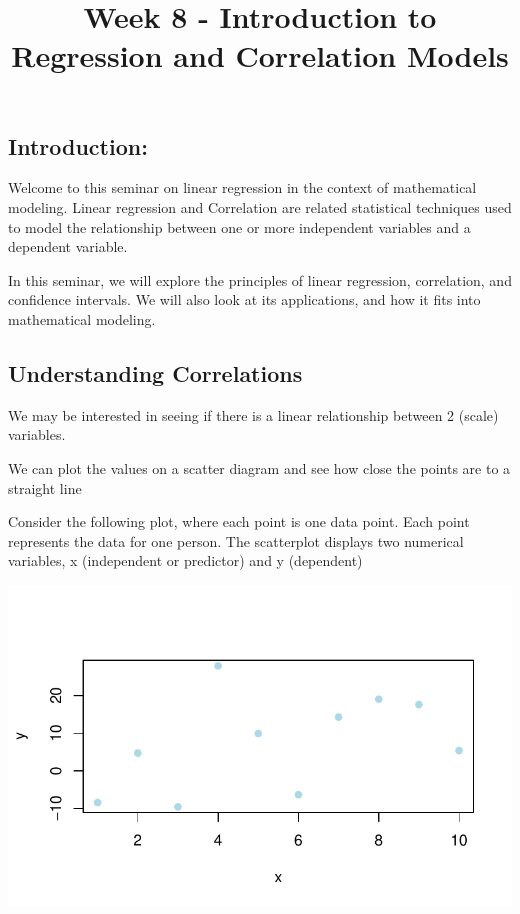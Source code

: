 \documentclass[
  letterpaper,
  DIV=11,
  numbers=noendperiod]{scrartcl}
\title{Week 8 - Introduction to Regression and Correlation Models}
\author{}
\date{}
\begin{document}
\maketitle

\subsection{Introduction:}\label{introduction}

Welcome to this seminar on linear regression in the context of
mathematical modeling. Linear regression and Correlation are related
statistical techniques used to model the relationship between one or
more independent variables and a dependent variable.

In this seminar, we will explore the principles of linear regression,
correlation, and confidence intervals. We will also look at its
applications, and how it fits into mathematical modeling.

\subsection{Understanding
Correlations}\label{understanding-correlations}

We may be interested in seeing if there is a linear relationship between
2 (scale) variables.

We can plot the values on a scatter diagram and see how close the points
are to a straight line

Consider the following plot, where each point is one data point. Each
point represents the data for one person. The scatterplot displays two
numerical variables, x (independent or predictor) and y (dependent)

\includegraphics{Week8a_files/figure-pdf/unnamed-chunk-1-1.pdf}
\end{document}
